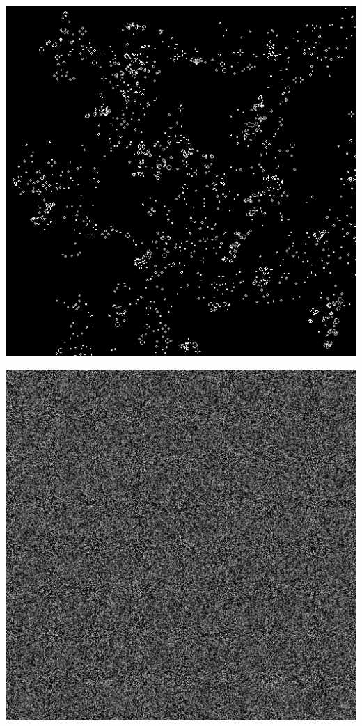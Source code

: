 \documentclass[11pt, oneside]{article}
\newenvironment{Figure}
  {\par\medskip\noindent\minipage{\linewidth}}
  {\endminipage\par\medskip}
\begin{document}
\begin{multicols}{3}
\begin{Figure}
\includegraphics[width=\linewidth]{images/512x512_2.png}
\end{Figure}

\begin{Figure}
\includegraphics[width=\linewidth]{images/1472x1472.png}
\end{Figure}

\end{multicols}
\end{document}
